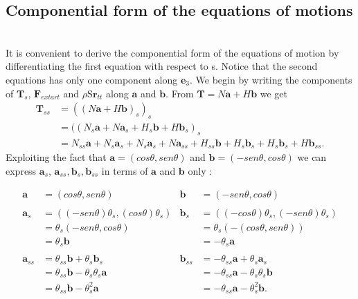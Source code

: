 

\subsection{Componential form of the equations of motions}\label{componential-form-of-the-equations-of-motion}\\

It is convenient to derive the componential form of the equations of motion by differentiating the first equation with respect to s.
Notice that the second equations has only one component along $\mathbf{e}_3$.
We begin by writing the components of $\mathbf{T}_s$, $\mathbf{F}_{extart}$ and $\rho$S$\mathbf{r}_{tt}$ along $\mathbf{a}$ and $\mathbf{b}$. From $\mathbf{T}=N\mathbf{a}+H\mathbf{b}$ we get
\begin{equation}
\begin{split}
\mathbf{T}_{ss}& =((N\mathbf{a}+H\mathbf{b})_s)_s\\
               & =((N_s\mathbf{a}+ N\mathbf{a}_s + H_s\mathbf{b} + H\mathbf{b}_s)_s\\
               & = N_{ss}\mathbf{a} + N_s\mathbf{a}_s + N_s\mathbf{a}_s + N\mathbf{a}_{ss} + H_{ss}\mathbf{b} + H_s\mathbf{b}_s + H_s\mathbf{b}_s + H\mathbf{b}_{ss}.
\end{split}
\end{equation}
Exploiting the fact that $\mathbf{a}=(cos\theta, sen\theta)$ and $\mathbf{b}=(-sen\theta, cos\theta)$ we can express $\mathbf{a}_s$, $\mathbf{a}_{ss}, \mathbf{b}_s, \mathbf{b}_{ss}$ in terms of $\mathbf{a}$ and $\mathbf{b}$ only :

\begin{align}
\mathbf{a}   & = (cos\theta,sen\theta)                        &\mathbf{b}& = (-sen\theta, cos\theta)\\\\
\mathbf{a}_s & = ((-sen\theta)\theta_s, (cos\theta)\theta_s)  &\mathbf{b}_s& = ((-cos\theta)\theta_s, (-sen\theta)\theta_s)\\
             & = \theta_s(-sen\theta, cos\theta)              & &= \theta_s(-(cos\theta, sen\theta))\\
             & =\theta_s\mathbf{b}                            & &= -\theta_s\mathbf{a}\\\\
\mathbf{a}_{ss}& = \theta_{ss}\mathbf{b}+\theta_s\mathbf{b}_s & 
\mathbf{b}_{ss}& = -\theta_{ss}\mathbf{a}+\theta_s\mathbf{a}_s\\
               & = \theta_{ss}\mathbf{b} - \theta_s\theta_s\mathbf{a} & &= -\theta_{ss}\mathbf{a} -\theta_s\theta_s\mathbf{b}\\
               & = \theta_{ss}\mathbf{b} - \theta_s^2\mathbf{a} & &= -\theta_{ss}\mathbf{a} -\theta_s^2\mathbf{b}.
\end{align}

